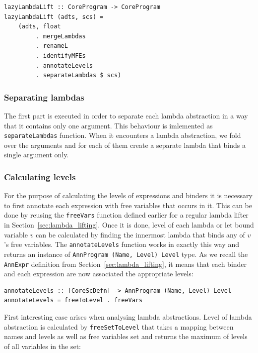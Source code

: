 \documentclass[12pt,a4paper]{report}
\begin{document}
\vspace*{0.2in}
\begin{lstlisting}[style=haskell]
lazyLambdaLift :: CoreProgram -> CoreProgram
lazyLambdaLift (adts, scs) =
    (adts, float
         . mergeLambdas
         . renameL
         . identifyMFEs
         . annotateLevels
         . separateLambdas $ scs)
\end{lstlisting}

\subsubsection{Separating lambdas}
The first part is executed in order to separate each lambda abstraction in a
way that it contains only one argument. This behaviour is imlemented as
\texttt{separateLambdas} function. When it encounters a lambda abstraction, we
fold over the arguments and for each of them create a separate lambda that
binds a single argument only.

\subsubsection{Calculating levels}
For the purpose of calculating the levels of expressions and binders it is
necessary to first annotate each expression with free variables that occurs in
it. This can be done by reusing the \texttt{freeVars} function defined earlier
for a regular lambda lifter in Section~\ref{sec:lambda_lifting}. Once it is
done, level of each lambda or let bound variable $v$ can be calculated by
finding the innermost lambda that binds any of $v$'s free variables. The
\texttt{annotateLevels} function works in exactly this way and returns an
instance of \texttt{AnnProgram (Name, Level) Level} type. As we recall the
\texttt{AnnExpr} definition from Section~\ref{sec:lambda_lifting}, it means
that each binder and each expression are now associated the appropriate levels:

\vspace*{0.2in}
\begin{lstlisting}[style=haskell]
annotateLevels :: [CoreScDefn] -> AnnProgram (Name, Level) Level
annotateLevels = freeToLevel . freeVars
\end{lstlisting}

First interesting case arises when analysing lambda abstractions. Level of
lambda abstraction is calculated by \texttt{freeSetToLevel} that takes a
mapping between names and levels as well as free variables set and returns the
maximum of levels of all variables in the set:
\end{document}
